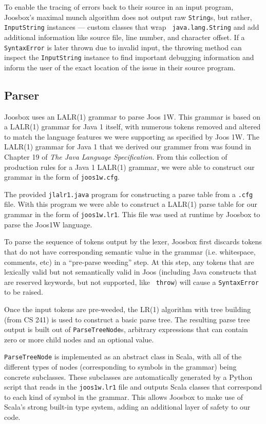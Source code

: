 \documentclass[letterpaper]{article}
\begin{document}
  To enable the tracing of errors back to their source in an input program,
  Joosbox's maximal munch algorithm does not output raw {\tt String}s, but
  rather, {\tt InputString} instances --- custom classes that wrap {\tt
  java.lang.String} and add additional information like source file, line
  number, and character offset. If a {\tt SyntaxError} is later thrown due to
  invalid input, the throwing method can inspect the {\tt InputString}
  instance to find important debugging information and inform the user of the
  exact location of the issue in their source program.

  \subsection{Parser}

  Joosbox uses an LALR(1) grammar to parse Joos 1W. This grammar is based on a
  LALR(1) grammar for Java 1 itself, with numerous tokens removed and altered to
  match the language features we were supporting as specified by Joos 1W. The
  LALR(1) grammar for Java 1 that we derived our grammer from was found in
  Chapter 19 of {\em The Java Language Specification}. From this collection of
  production rules for a Java 1 LALR(1) grammar, we were able to construct our
  grammar in the form of {\tt joos1w.cfg}.

  The provided {\tt jlalr1.java} program for constructing a parse table from a
  {\tt.cfg} file. With this program we were able to construct a LALR(1) parse
  table for our grammar in the form of {\tt joos1w.lr1}. This file was used at
  runtime by Joosbox to parse the Joos1W language.

  To parse the sequence of tokens output by the lexer, Joosbox first discards
  tokens that do not have corresponding semantic value in the grammar (i.e.
  whitespace, comments, etc) in a ``pre-parse weeding'' step. At this step, any
  tokens that are lexically valid but not semantically valid in Joos (including
  Java constructs that are reserved keywords, but not supported, like {\tt
  throw}) will cause a {\tt SyntaxError} to be raised.

  Once the input tokens are pre-weeded, the LR(1) algorithm with tree building
  (from CS 241) is used to construct a basic parse tree. The resulting parse
  tree output is built out of {\tt ParseTreeNode}s, arbitrary expressions that
  can contain zero or more child nodes and an optional value.

  {\tt ParseTreeNode} is implemented as an abstract class in Scala, with all of
  the different types of nodes (corresponding to symbols in the grammar) being
  concrete subclasses. These subclasses are automatically generated by a Python
  script that reads in the {\tt joos1w.lr1} file and outputs Scala classes that
  correspond to each kind of symbol in the grammar. This allows Joosbox to make
  use of Scala's strong built-in type system, adding an additional layer of
  safety to our code.
\end{document}
